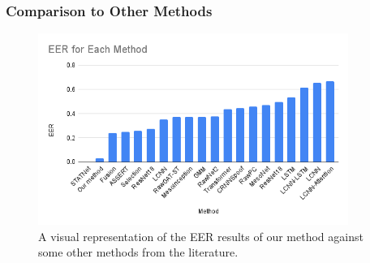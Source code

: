 \documentclass{article}
\begin{document}
		\subsubsection{Comparison to Other Methods}
			\begin{figure}[htbp]
				\centering
				\includegraphics[width=0.9\textwidth]{images/method_comparison.png}
				\caption{A visual representation of the EER results of our method against some
					other methods from the literature.}
			\end{figure}
\end{document}
